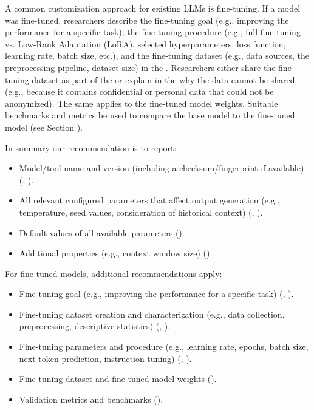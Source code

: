 A common customization approach for existing LLMs is fine-tuning. If a model was fine-tuned, researchers \must describe the fine-tuning goal (e.g., improving the performance for a specific task), the fine-tuning procedure (e.g., full fine-tuning vs. Low-Rank Adaptation (LoRA), selected hyperparameters, loss function, learning rate, batch size, etc.), and the fine-tuning dataset (e.g., data sources, the preprocessing pipeline, dataset size) in the \paper.
Researchers \should either share the fine-tuning dataset as part of the \supplementarymaterial or explain in the \paper why the data cannot be shared (e.g., because it contains confidential or personal data that could not be anonymized).
The same applies to the fine-tuned model weights.
Suitable benchmarks and metrics \should be used to compare the base model to the fine-tuned model (see Section \benchmarksmetrics).

In summary our recommendation is to report:

\begin{itemize}
\item Model/tool name and version (including a checksum/fingerprint if available) (\must, \paper).
\item All relevant configured parameters that affect output generation (e.g., temperature, seed values, consideration of historical context) (\must, \paper).
\item Default values of all available parameters (\should).
\item Additional properties (e.g., context window size) (\may).
\end{itemize}

For fine-tuned models, additional recommendations apply:

\begin{itemize}
\item Fine-tuning goal (e.g., improving the performance for a specific task) (\must, \paper).
\item Fine-tuning dataset creation and characterization (e.g., data collection, preprocessing, descriptive statistics) (\must, \paper).
\item Fine-tuning parameters and procedure (e.g., learning rate, epochs, batch size, next token prediction, instruction tuning) (\must, \paper).
\item Fine-tuning dataset and fine-tuned model weights (\should).
\item Validation metrics and benchmarks (\should).
\end{itemize}

